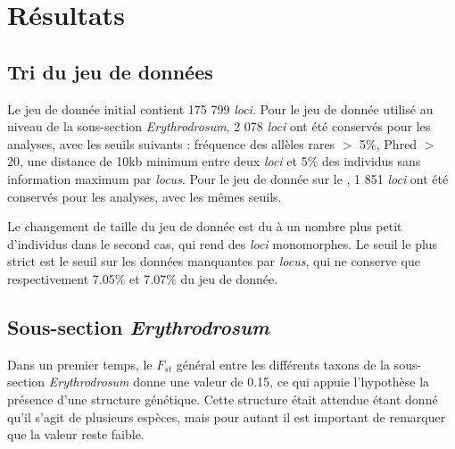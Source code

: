\section{Résultats}

\subsection{Tri du jeu de données}

Le jeu de donnée initial contient 175 799 \textit{loci}. Pour le jeu de donnée utilisé au niveau de la sous-section \textit{Erythrodrosum}, 2 078 \textit{loci} ont été conservés pour les analyses, avec les seuils suivants :  fréquence des allèles rares $>$ 5\%, Phred $>$ 20, une distance de 10kb minimum entre deux \textit{loci} et 5\% des individus sans information maximum par \textit{locus}.
Pour le jeu de donnée sur le , 1 851 \textit{loci} ont été conservés pour les analyses, avec les mêmes seuils.

Le changement de taille du jeu de donnée est du à un nombre plus petit d'individus dans le second cas, qui rend des \textit{loci} monomorphes. Le seuil le plus strict est le seuil sur les données manquantes par \textit{locus}, qui ne conserve que  respectivement 7.05\% et 7.07\% du jeu de donnée. 

\subsection{Sous-section \textit{Erythrodrosum}}

Dans un premier temps, le $F_{st}$ général entre les différents taxons de la sous-section \textit{Erythrodrosum} donne une valeur de 0.15, ce qui appuie l'hypothèse la présence d'une structure génétique. Cette structure était attendue étant donné qu'il s'agit de plusieurs espèces, mais pour autant il est important de remarquer que la valeur reste faible.

